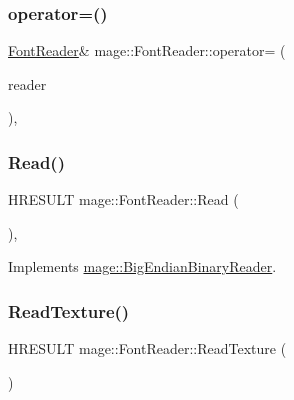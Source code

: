 \hypertarget{classmage_1_1_font_reader_a0441ffde1a8246ea1ece461fd22bf691}{}\label{classmage_1_1_font_reader_a0441ffde1a8246ea1ece461fd22bf691} 
\subsubsection{\texorpdfstring{operator=()}{operator=()}}
{\footnotesize\ttfamily \hyperlink{classmage_1_1_font_reader}{Font\+Reader}\& mage\+::\+Font\+Reader\+::operator= (\begin{DoxyParamCaption}\item[{const \hyperlink{classmage_1_1_font_reader}{Font\+Reader} \&}]{reader }\end{DoxyParamCaption})\hspace{0.3cm}{\ttfamily [private]}, {\ttfamily [delete]}}

\hypertarget{classmage_1_1_font_reader_af802d9181c0556b82fa701b5c940068d}{}\label{classmage_1_1_font_reader_af802d9181c0556b82fa701b5c940068d} 
\subsubsection{\texorpdfstring{Read()}{Read()}}
{\footnotesize\ttfamily H\+R\+E\+S\+U\+LT mage\+::\+Font\+Reader\+::\+Read (\begin{DoxyParamCaption}{ }\end{DoxyParamCaption})\hspace{0.3cm}{\ttfamily [override]}, {\ttfamily [virtual]}}



Implements \hyperlink{classmage_1_1_big_endian_binary_reader_a723f28280c4e1343f42f41eea2b97015}{mage\+::\+Big\+Endian\+Binary\+Reader}.

\hypertarget{classmage_1_1_font_reader_a9bdb734bbd8d3859fe34672fafa1a760}{}\label{classmage_1_1_font_reader_a9bdb734bbd8d3859fe34672fafa1a760} 
\subsubsection{\texorpdfstring{Read\+Texture()}{ReadTexture()}}
{\footnotesize\ttfamily H\+R\+E\+S\+U\+LT mage\+::\+Font\+Reader\+::\+Read\+Texture (\begin{DoxyParamCaption}{ }\end{DoxyParamCaption})\hspace{0.3cm}{\ttfamily [protected]}}



